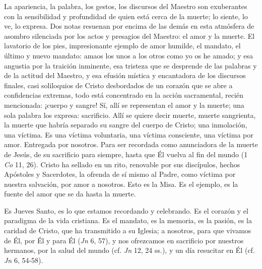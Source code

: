 \begin{body}
La apariencia, la palabra, los gestos, los discursos del Maestro son exuberantes con la sensibilidad y profundidad de quien está cerca de la muerte; lo siente, lo ve, lo expresa. Dos notas resuenan por encima de las demás en esta atmósfera de asombro silenciada por los actos y presagios del Maestro: el amor y la muerte. El lavatorio de los pies, impresionante ejemplo de amor humilde, el mandato, el último y nuevo mandato: amaos los unos a los otros como yo os he amado; y esa angustia por la traición inminente, esa tristeza que se desprende de las palabras y de la actitud del Maestro, y esa efusión mística y encantadora de los discursos finales, casi soliloquios de Cristo desbordados de un corazón que se abre a confidencias extremas, todo está concentrado en la acción sacramental, recién mencionada: ¡cuerpo y sangre! Sí, allí se representan el amor y la muerte; una sola palabra los expresa: sacrificio. Allí se quiere decir muerte, muerte sangrienta, la muerte que habría separado su sangre del cuerpo de Cristo; una inmolación, una víctima. Es una víctima voluntaria, una víctima consciente, una víctima por amor. Entregada por nosotros. Para ser recordada como anunciadora de la muerte de Jesús, de su sacrificio para siempre, hasta que Él vuelva al fin del mundo (1 \textit{Co} 11, 26). Cristo ha sellado en un rito, renovable por sus discípulos, hechos Apóstoles y Sacerdotes, la ofrenda de sí mismo al Padre, como víctima por nuestra salvación, por amor a nosotros. Esto es la Misa. Es el ejemplo, es la fuente del amor que se da hasta la muerte. 

Es Jueves Santo, es lo que estamos recordando y celebrando. Es el corazón y el paradigma de la vida cristiana. Es el mandato, es la memoria, es la pasión, es la caridad de Cristo, que ha transmitido a su Iglesia; a nosotros, para que vivamos de Él, por Él y para Él (\textit{Jn} 6, 57), y nos ofrezcamos en sacrificio por nuestros hermanos, por la salud del mundo (cf. \textit{Jn} 12, 24 ss.), y un día resucitar en Él (cf. \textit{Jn} 6, 54-58).
\end{body}

\label{b-05-01-1970H}

